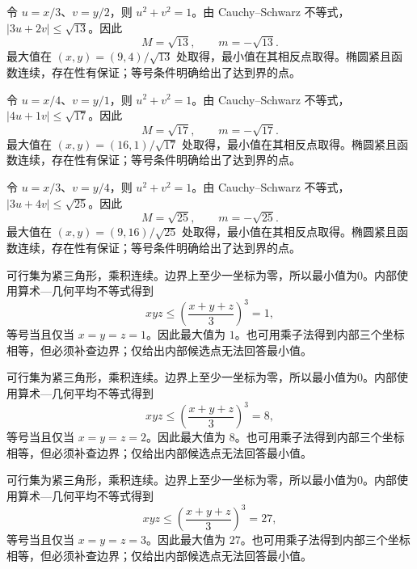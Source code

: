 \documentclass[12pt,fontset=fandol]{ctexart}
\begin{document}
\begin{solve}\label{ans:c35q4}
令 $u=x/3$、$v=y/2$，则 $u^2+v^2=1$。由 Cauchy--Schwarz 不等式，$|3u+2v|\le\sqrt{13}$。因此
\[
M=\sqrt{13},\qquad m=-\sqrt{13}.
\]
最大值在 $(x,y)=(9,4)/\sqrt{13}$ 处取得，最小值在其相反点取得。椭圆紧且函数连续，存在性有保证；等号条件明确给出了达到界的点。
\end{solve}

\begin{solve}\label{ans:c35q5}
令 $u=x/4$、$v=y/1$，则 $u^2+v^2=1$。由 Cauchy--Schwarz 不等式，$|4u+1v|\le\sqrt{17}$。因此
\[
M=\sqrt{17},\qquad m=-\sqrt{17}.
\]
最大值在 $(x,y)=(16,1)/\sqrt{17}$ 处取得，最小值在其相反点取得。椭圆紧且函数连续，存在性有保证；等号条件明确给出了达到界的点。
\end{solve}

\begin{solve}\label{ans:c35q6}
令 $u=x/3$、$v=y/4$，则 $u^2+v^2=1$。由 Cauchy--Schwarz 不等式，$|3u+4v|\le\sqrt{25}$。因此
\[
M=\sqrt{25},\qquad m=-\sqrt{25}.
\]
最大值在 $(x,y)=(9,16)/\sqrt{25}$ 处取得，最小值在其相反点取得。椭圆紧且函数连续，存在性有保证；等号条件明确给出了达到界的点。
\end{solve}

\begin{solve}\label{ans:c35q7}
可行集为紧三角形，乘积连续。边界上至少一坐标为零，所以最小值为0。内部使用算术—几何平均不等式得到
\[
xyz\le\left(\frac{x+y+z}3\right)^3=1,
\]
等号当且仅当 $x=y=z=1$。因此最大值为 $1$。也可用乘子法得到内部三个坐标相等，但必须补查边界；仅给出内部候选点无法回答最小值。
\end{solve}

\begin{solve}\label{ans:c35q8}
可行集为紧三角形，乘积连续。边界上至少一坐标为零，所以最小值为0。内部使用算术—几何平均不等式得到
\[
xyz\le\left(\frac{x+y+z}3\right)^3=8,
\]
等号当且仅当 $x=y=z=2$。因此最大值为 $8$。也可用乘子法得到内部三个坐标相等，但必须补查边界；仅给出内部候选点无法回答最小值。
\end{solve}

\begin{solve}\label{ans:c35q9}
可行集为紧三角形，乘积连续。边界上至少一坐标为零，所以最小值为0。内部使用算术—几何平均不等式得到
\[
xyz\le\left(\frac{x+y+z}3\right)^3=27,
\]
等号当且仅当 $x=y=z=3$。因此最大值为 $27$。也可用乘子法得到内部三个坐标相等，但必须补查边界；仅给出内部候选点无法回答最小值。
\end{solve}
\end{document}
